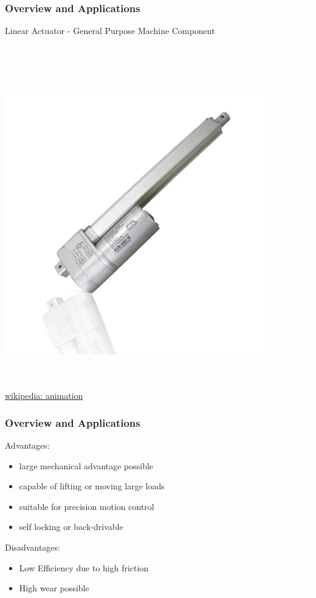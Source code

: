 \documentclass[fleqn]{beamer} %
\newcommand{\sectiontitleI}{Overview and Applications}
\begin{document}
	\begin{frame}[label=sectionI] \small
		\frametitle{\sectiontitleI}	
		Linear Actuator - General Purpose Machine Component

		\includegraphics[scale=0.2]{images/fergelli_optical_feedback_actuator.png}

		\href{https://en.wikipedia.org/wiki/Linear_actuator\#/media/File:Linear_actuator_basic.gif}{wikipedia: animation}

	\end{frame}





	\begin{frame}[label=sectionI] \small
		\frametitle{\sectiontitleI}	
		
		Advantages:
		\begin{itemize}
			\item large mechanical advantage possible
			\item capable of lifting or moving large loads 
			\item suitable for precision motion control
			\item self locking or back-drivable 
		\end{itemize}

		Disadvantages:
		\begin{itemize}
			\item Low Efficiency due to high friction
			\item High wear possible	
		\end{itemize}

	\end{frame}
\end{document}
